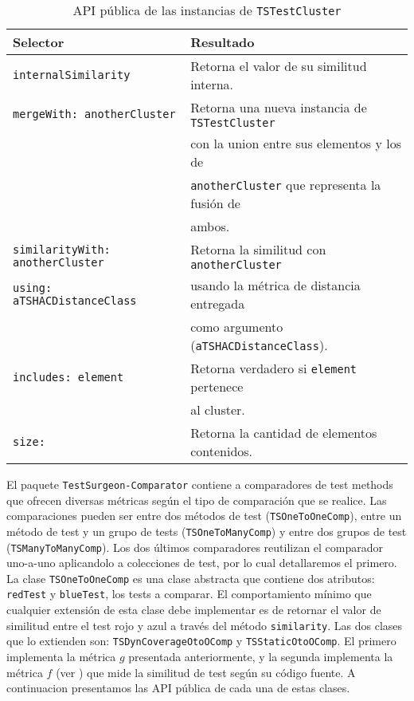 \begin{table}[h] 
    \centering 
    \begin{tabular}{|l|l|}
    	\hline
\textbf{Selector} & \textbf{Resultado} \\ \hline \hline

{\tt internalSimilarity } & Retorna el valor de su similitud interna.\\ \hline
{\tt mergeWith: anotherCluster} & Retorna una nueva instancia de {\tt TSTestCluster} \\ 
						& con la union entre sus elementos y los de  \\ 
						& {\tt anotherCluster} que representa la fusión de \\
						& ambos. \\ \hline
{\tt similarityWith: anotherCluster}	& Retorna la similitud con {\tt anotherCluster} \\ 
{\tt using: aTSHACDistanceClass } &  usando la métrica de distancia entregada  \\
						& como argumento ({\tt aTSHACDistanceClass}).\\ \hline
{\tt includes: element} & Retorna verdadero si {\tt element} pertenece \\
						&  al cluster.\\ \hline
{\tt size:} & Retorna la cantidad de elementos contenidos. \\ \hline		
				
    \end{tabular}
    \caption{API pública de las instancias de {\tt TSTestCluster}}
\end{table}  

\vspace*{2cm}

\par El paquete {\tt TestSurgeon-Comparator} contiene a comparadores de test methods que ofrecen diversas métricas según el tipo de comparación que se realice. Las comparaciones pueden ser entre dos métodos de test ({\tt TSOneToOneComp}), entre un método de test y un grupo de tests ({\tt TSOneToManyComp}) y entre dos grupos de test ({\tt TSManyToManyComp}). Los dos últimos comparadores reutilizan el comparador uno-a-uno aplicandolo a colecciones de test, por lo cual detallaremos el primero. La clase {\tt TSOneToOneComp} es una clase abstracta que contiene dos atributos: {\tt redTest} y {\tt blueTest}, los tests a comparar. El comportamiento mínimo que cualquier extensión de esta clase debe implementar es de retornar el valor de similitud entre el test rojo y azul a través del método {\tt similarity}. Las dos clases que lo extienden son: {\tt TSDynCoverageOtoOComp} y {\tt TSStaticOtoOComp}. El primero implementa la métrica $g$ presentada anteriormente, y la segunda implementa la métrica $f$ (ver ) que mide la similitud de test según su código fuente. A continuacion presentamos las API pública de cada una de estas clases.



